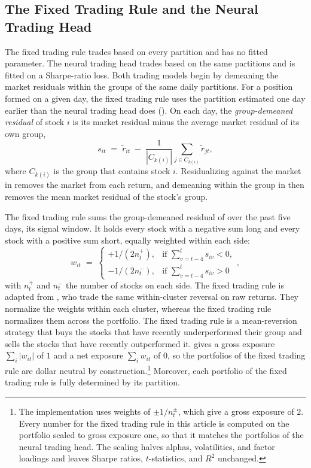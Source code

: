 \subsection{The Fixed Trading Rule and the Neural Trading Head}
\label{sec:components}

The fixed trading rule trades based on every partition and has no fitted parameter. The neural trading head trades based on the same partitions and is fitted on a Sharpe-ratio loss. Both trading models begin by demeaning the market residuals within the groups of the same daily partitions. For a position formed on a given day, the fixed trading rule uses the partition estimated one day earlier than the neural trading head does (). On each day, the \emph{group-demeaned residual} of stock $i$ is its market residual minus the average market residual of its own group,
%
\begin{equation}\label{eq:relsig}
  s_{it} \;=\; \tilde r_{it} \;-\; \frac{1}{|C_{k(i)}|}
               \sum_{j \in C_{k(i)}} \tilde r_{jt},
\end{equation}
%
where $C_{k(i)}$ is the group that contains stock $i$. Residualizing against the market in
 removes the market from each return, and demeaning within the group in  then removes the mean market residual of the stock's group.

The fixed trading rule sums the group-demeaned residual of  over the past five days, its signal window. It holds every stock with a negative sum long and every stock with a positive sum short, equally weighted within each side:
%
\begin{equation}\label{eq:naivew}
  w_{it} \;=\;
  \begin{cases}
    +1/(2n^{+}_{t}), & \text{if } \displaystyle\sum_{v=t-4}^{t} s_{iv} < 0,\\[6pt]
    -1/(2n^{-}_{t}), & \text{if } \displaystyle\sum_{v=t-4}^{t} s_{iv} > 0
  \end{cases},
\end{equation}
%
with $n^{+}_{t}$ and $n^{-}_{t}$ the number of stocks on each side. The fixed trading rule is adapted from \citet{Jinetal2023}, who trade the same within-cluster reversal on raw returns. They normalize the weights within
each cluster, whereas the fixed trading rule normalizes them across the portfolio. The fixed trading rule is a mean-reversion strategy that buys the stocks that have recently underperformed their group and sells the stocks that have recently outperformed it.  gives a gross exposure $\sum_i |w_{it}|$ of $1$ and a net exposure $\sum_i w_{it}$ of $0$, so the portfolios of the fixed trading rule are dollar neutral by construction.\footnote{The implementation uses weights of $\pm 1/n^{\pm}_{t}$, which give a gross exposure of $2$. Every number for the fixed trading rule in this article is computed on the portfolio scaled to gross exposure one, so that it matches the portfolios of the neural trading head. The scaling halves alphas, volatilities, and factor loadings and leaves Sharpe ratios, $t$-statistics, and $R^2$ unchanged.} Moreover, each portfolio of the fixed trading rule is fully determined by its partition.

